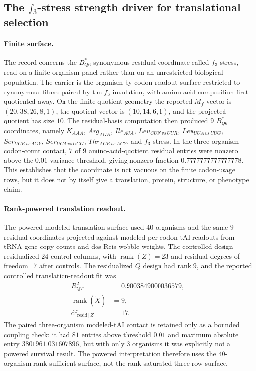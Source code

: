 \subsection{The $f_3$-stress strength driver for translational selection}\label{sec:bioreality-f3-stress-strength-driver}

\paragraph{Finite surface.}
The record concerns the $B^*_{Q6}$ synonymous residual coordinate called $f_3$-stress, read on a finite organism panel rather than on an unrestricted biological population.  The carrier is the organism-by-codon readout surface restricted to synonymous fibers paired by the $f_3$ involution, with amino-acid composition first quotiented away.  On the finite quotient geometry the reported $M_f$ vector is $(20,38,26,8,1)$, the quotient vector is $(10,14,6,1)$, and the projected quotient has size $10$.  The residual-basis computation then produced $9$ $B^*_{Q6}$ coordinates, namely $K_{AAA}$, $Arg_{AGR}$, $Ile_{AUA}$, $Leu_{CUN\,vs\,UUR}$, $Leu_{UUA\,vs\,UUG}$, $Ser_{UCR\,vs\,AGY}$, $Ser_{UCA\,vs\,UCG}$, $Thr_{ACR\,vs\,ACY}$, and $f_3$-stress.  In the three-organism codon-count contact, $7$ of $9$ amino-acid-quotient residual entries were nonzero above the $0.01$ variance threshold, giving nonzero fraction $0.7777777777777778$.  This establishes that the coordinate is not vacuous on the finite codon-usage rows, but it does not by itself give a translation, protein, structure, or phenotype claim.

\paragraph{Rank-powered translation readout.}
The powered modeled-translation surface used $40$ organisms and the same $9$ residual coordinates projected against modeled per-codon tAI readouts from tRNA gene-copy counts and dos Reis wobble weights.  The controlled design residualized $24$ control columns, with $\operatorname{rank}(Z)=23$ and residual degrees of freedom $17$ after controls.  The residualized $Q$ design had rank $9$, and the reported controlled translation-readout fit was
$$
\begin{aligned}
R^2_{QT} &= 0.9003849000036579,\\
\operatorname{rank}(\widetilde X) &= 9,\\
\operatorname{df}_{\mathrm{resid}\,|\,Z} &= 17.
\end{aligned}
$$
The paired three-organism modeled-tAI contact is retained only as a bounded coupling check: it had $81$ entries above threshold $0.01$ and maximum absolute entry $3801961.031607896$, but with only $3$ organisms it was explicitly not a powered survival result.  The powered interpretation therefore uses the $40$-organism rank-sufficient surface, not the rank-saturated three-row surface.

